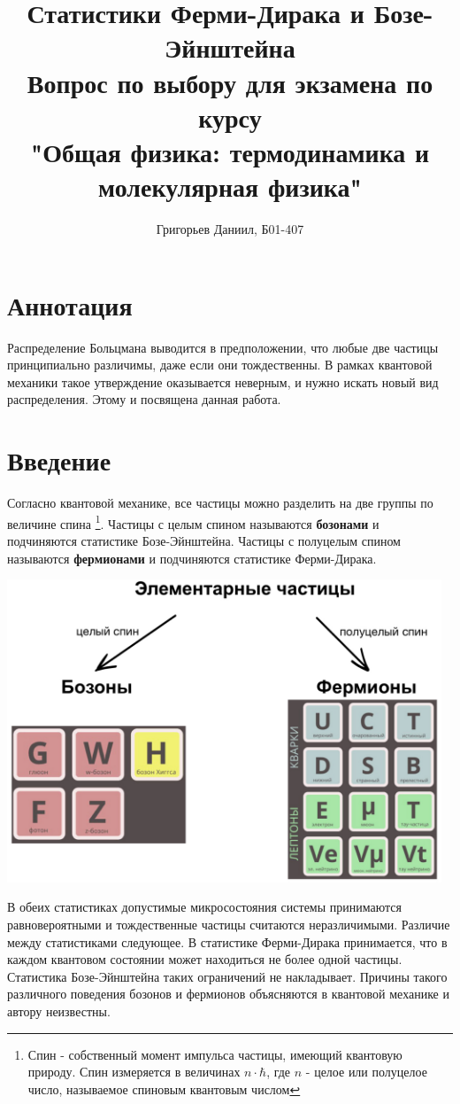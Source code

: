 \documentclass[A4]{article}
\title{\textbf{Статистики Ферми-Дирака и Бозе-Эйнштейна}\\
       Вопрос по выбору для экзамена по курсу\\
       "Общая физика: термодинамика и молекулярная физика"}
\author{Григорьев Даниил, Б01-407}
\date{}
\begin{document}
\maketitle

\newpage
\section{Аннотация}

    Распределение Больцмана выводится в предположении, что любые две частицы принципиально
    различимы, даже если они тождественны. В рамках квантовой механики такое утверждение оказывается
    неверным, и нужно искать новый вид распределения. Этому и посвящена данная работа.

\section{Введение}

    Согласно квантовой механике, все частицы можно разделить на две группы по величине спина
    \footnote{Спин - собственный момент импульса частицы, имеющий квантовую природу. Спин измеряется в
    величинах $n\cdot\hbar$, где $n$ - целое или полуцелое число, называемое спиновым квантовым числом}.
    Частицы с целым спином называются \textbf{бозонами} и подчиняются статистике Бозе-Эйнштейна.
    Частицы с полуцелым спином называются \textbf{фермионами} и подчиняются статистике Ферми-Дирака.

    \begin{center}
        \includegraphics[width=13cm]{elementary.png}
    \end{center}

    В обеих статистиках допустимые микросостояния системы принимаются равновероятными и тождественные
    частицы считаются неразличимыми. Различие между статистиками следующее. В статистике Ферми-Дирака
    принимается, что в каждом квантовом состоянии может находиться не более одной частицы. Статистика
    Бозе-Эйнштейна таких ограничений не накладывает. Причины такого различного поведения бозонов и
    фермионов объясняются в квантовой механике и автору неизвестны.
\end{document}
